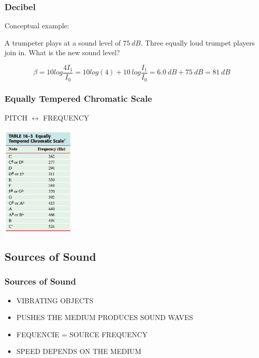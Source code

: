 \documentclass[]{beamer}
\begin{document}

\begin{frame}
\frametitle{Decibel}
Conceptual example:

\vspace{3mm}

A trumpeter plays at a sound level of $75~dB$. Three equally loud trumpet players join in. What is the new
sound level?

\begin{equation*}
\beta =10 log\frac{4 I_1}{I_0}=10log(4)+10~log\frac{ I_1}{I_0}=6.0~dB+75~dB=81~dB
\end{equation*}


  \end{frame}





\begin{frame}
  \frametitle{Equally Tempered Chromatic Scale}
  
  PITCH $\leftrightarrow$ FREQUENCY
  
  
    \begin{center}
    \includegraphics[height=2.1in]{images4/scale.jpg}
  \end{center}
  
  
  
    \end{frame}

    

\subsection{Sources of Sound}

\begin{frame}
\frametitle{Sources of Sound}

\begin{itemize}
  \item VIBRATING OBJECTS \pause
  \item PUSHES THE MEDIUM \pause PRODUCES SOUND WAVES \pause
  \item FEQUENCIE = SOURCE FREQUENCY \pause
  \item SPEED DEPENDS ON THE MEDIUM \pause
\end{itemize}








  \end{frame}
\end{document}
